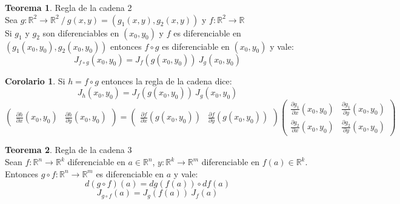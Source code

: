 \documentclass[10pt]{article}
\theoremstyle{definition}
\newtheorem{theorem}{Teorema}[section]
\newtheorem{corollary}{Corolario}[theorem]
\begin{document}
\begin{theorem}{Regla de la cadena 2}
    \\Sea $g:\mathbb{R}^2\to\mathbb{R}^2\ /\ g(x,y)=(g_1(x,y),g_2(x,y))$ y $f:\mathbb{R}^2\to\mathbb{R}$
    \\Si $g_1$ y $g_2$ son diferenciables en $(x_0,y_0)$ y $f$ es diferenciable en $(g_1(x_0,y_0),g_2(x_0,y_0))$ entonces $f\circ g$ es diferenciable en $(x_0,y_0)$ y vale: $$J_{f\circ g}(x_0,y_0)=J_f(g(x_0,y_0))\ J_g(x_0,y_0)$$
\end{theorem}
\begin{corollary}
    Si $h=f\circ g$ entonces la regla de la cadena dice:$$J_h(x_0,y_0)=J_f(g(x_0,y_0))\ J_g(x_0,y_0)$$
    $$\begin{pmatrix} \frac{\partial h}{\partial x}(x_0,y_0) & \frac{\partial h}{\partial y}(x_0,y_0) \end{pmatrix}
    = \begin{pmatrix} \frac{\partial f}{\partial x}(g(x_0,y_0)) & \frac{\partial f}{\partial y} (g(x_0,y_0)) \end{pmatrix} 
    \begin{pmatrix} \frac{\partial g_1}{\partial x}(x_0,y_0) & \frac{\partial g_1}{\partial y}(x_0,y_0) \\ \frac{\partial g_2}{\partial x}(x_0,y_0) & \frac{\partial g_2}{\partial y} (x_0,y_0)\end{pmatrix} $$
\end{corollary}
\begin{theorem}{Regla de la cadena 3}
    \\Sean $f:\mathbb{R}^n\to\mathbb{R}^k$ diferenciable en $a\in\mathbb{R}^n$, $y:\mathbb{R}^k\to\mathbb{R}^m$ diferenciable en $f(a)\in\mathbb{R}^k$.
    \\Entonces $g\circ f:\mathbb{R}^n\to\mathbb{R}^m$ es diferenciable en $a$ y vale: $$d(g\circ f)(a)=dg(f(a))\circ df(a)$$
    $$J_{g\circ f}(a)=J_g(f(a))\ J_f(a)$$
\end{theorem}
\end{document}
